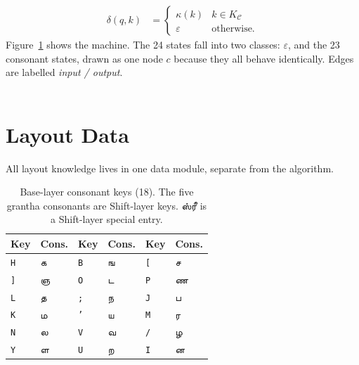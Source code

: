 \documentclass[11pt,a4paper]{article}
\newcommand{\tam}[1]{{\tamilfont #1}}
\newcommand{\empt}{\varepsilon}
\newcommand{\cset}{\mathcal{C}}
\begin{document}
\begin{align}
  \delta(q,k) &=
  \begin{cases}
    \kappa(k) & k\in K_{\cset}\\
    \empt & \text{otherwise.}
  \end{cases}
\end{align}
Figure~\ref{fig:mealy} shows the machine. The 24 states fall into two classes:
$\empt$, and the 23 consonant states, drawn as one node $c$ because they all
behave identically. Edges are labelled \emph{input / output}.
\\
\\
\begin{figure}[h]
\centering
{}
\label{fig:mealy}
\end{figure}

\newpage
\section{Layout Data}
All layout knowledge lives in one data module, separate from the algorithm.

\begin{table}[h]
\centering
\begin{tabular}{ll@{\qquad}ll@{\qquad}ll}
\toprule
Key & Cons. & Key & Cons. & Key & Cons.\\
\midrule
\texttt{H} & \tam{க} & \texttt{B} & \tam{ங} & \texttt{[} & \tam{ச}\\
\texttt{]} & \tam{ஞ} & \texttt{O} & \tam{ட} & \texttt{P} & \tam{ண}\\
\texttt{L} & \tam{த} & \texttt{;} & \tam{ந} & \texttt{J} & \tam{ப}\\
\texttt{K} & \tam{ம} & \texttt{'} & \tam{ய} & \texttt{M} & \tam{ர}\\
\texttt{N} & \tam{ல} & \texttt{V} & \tam{வ} & \texttt{/} & \tam{ழ}\\
\texttt{Y} & \tam{ள} & \texttt{U} & \tam{ற} & \texttt{I} & \tam{ன}\\
\bottomrule
\end{tabular}
\caption{Base-layer consonant keys (18). The five grantha consonants are
Shift-layer keys. \tam{ஸ்ரீ} is a Shift-layer special entry.}
\end{table}
\end{document}
